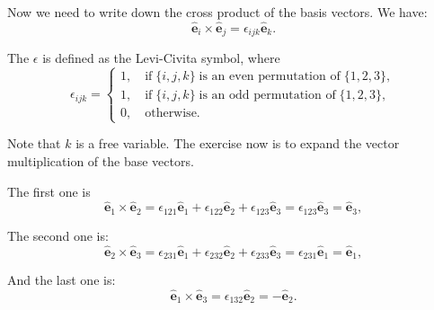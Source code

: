 \documentclass[../main.tex]{subfiles}
\begin{document}
	Now we need to write down the cross product of the basis vectors. We have:
	\begin{equation}
	  \hat{\mathbf{e}}_{i} \times \hat{\mathbf{e}}_{j} = \epsilon_{ijk} \hat{\mathbf{e}}_{k}.
	\end{equation}

	The $\epsilon$ is defined as the Levi-Civita symbol, where
	\begin{equation}
	  \epsilon_{ijk} = \begin{cases} 1, \quad \text{if} \; \{i,j,k\} \; \text{is an even permutation of} \; \{1,2,3\}, \\ 1, \quad \text{if} \; \{i,j,k\} \; \text{is an odd permutation of} \; \{1,2,3\}, \\ 0, \quad \text{otherwise.}  \end{cases}
	\end{equation}

	Note that $k$ is a free variable. The exercise now is to expand the vector multiplication of the base vectors.
	\begin{exercise}
		The first one is
		\begin{equation}
		  \hat{\mathbf{e}}_1 \times \hat{\mathbf{e}}_2 = \epsilon_{121}\hat{\mathbf{e}}_1 + \epsilon_{122}\hat{\mathbf{e}}_2 + \epsilon_{123}\hat{\mathbf{e}}_3 = \epsilon_{123} \hat{\mathbf{e}}_3 = \hat{\mathbf{e}}_3,
		\end{equation}

		The second one is:
		\begin{equation}
		  \hat{\mathbf{e}}_2 \times \hat{\mathbf{e}}_3 = \epsilon_{231}\hat{\mathbf{e}}_1 + \epsilon_{232}\hat{\mathbf{e}}_2 + \epsilon_{233}\hat{\mathbf{e}}_3 = \epsilon_{231}\hat{\mathbf{e}}_1 = \hat{\mathbf{e}}_1,
		\end{equation}

		And the last one is:
		\begin{equation}
		  \hat{\mathbf{e}}_1 \times \hat{\mathbf{e}}_3 = \epsilon_{132} \hat{\mathbf{e}}_2 = -\hat{\mathbf{e}}_2.
		\end{equation}
	\end{exercise}
\end{document}
